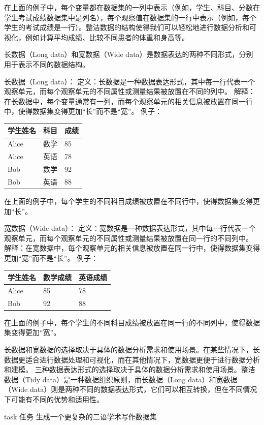 \documentclass[]{book}
\begin{document}
在上面的例子中，每个变量都在数据集的一列中表示（例如，学生、科目、分数在学生考试成绩数据集中是列名），每个观察值在数据集的一行中表示（例如，每个学生的考试成绩是一行）。整洁数据的结构使得我们可以轻松地进行数据分析和可视化，例如计算平均成绩、比较不同患者的体重和身高等。

长数据（Long data）和宽数据（Wide data）是数据表达的两种不同形式，分别用于表示不同的数据结构。

长数据（Long data）：
定义：长数据是一种数据表达形式，其中每一行代表一个观察单元，而每个观察单元的不同属性或测量结果被放置在不同的列中。
解释：在长数据中，每个变量通常有一列，而每个观察单元的相关信息被放置在同一行中，使得数据集变得更加``长''而不是``宽''。
例子：

\begin{longtable}[]{@{}lll@{}}
\toprule
学生姓名 & 科目 & 成绩\tabularnewline
\midrule
\endhead
Alice & 数学 & 85\tabularnewline
Alice & 英语 & 78\tabularnewline
Bob & 数学 & 92\tabularnewline
Bob & 英语 & 88\tabularnewline
\bottomrule
\end{longtable}

在上面的例子中，每个学生的不同科目成绩被放置在不同行中，使得数据集变得更加``长''。

宽数据（Wide data）：
定义：宽数据是一种数据表达形式，其中每一行代表一个观察单元，而每个观察单元的不同属性或测量结果被放置在同一行的不同列中。
解释：在宽数据中，每个观察单元的相关信息被放置在同一行中，使得数据集变得更加``宽''而不是``长''。
例子：

\begin{longtable}[]{@{}lll@{}}
\toprule
学生姓名 & 数学成绩 & 英语成绩\tabularnewline
\midrule
\endhead
Alice & 85 & 78\tabularnewline
Bob & 92 & 88\tabularnewline
\bottomrule
\end{longtable}

在上面的例子中，每个学生的不同科目成绩被放置在同一行的不同列中，使得数据集变得更加``宽''。

长数据和宽数据的选择取决于具体的数据分析需求和使用场景。在某些情况下，长数据更适合进行数据处理和可视化，而在其他情况下，宽数据更便于进行数据分析和建模。
三种数据表达形式的选择取决于具体的数据分析需求和使用场景。整洁数据（Tidy data）是一种数据组织原则，而长数据（Long data）和宽数据（Wide data）则是两种不同的数据表达形式，它们可以相互转换，但在不同情况下可能有不同的优势和适用性。

\begin{infobox}task
任务
生成一个更复杂的二语学术写作数据集

\end{infobox}
\end{document}
